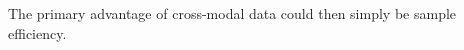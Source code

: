 \documentclass{article}
\newcommand{\fixme}[1]{{\bf\color{red}FIXME: #1}}
\newcommand{\jh}[1]{{\;\color{red}JH: #1}}
\theoremstyle{plain}
\theoremstyle{definition}
\theoremstyle{remark}
\begin{document}
% 
The primary advantage of cross-modal data could then simply be sample efficiency. 



\end{document}
